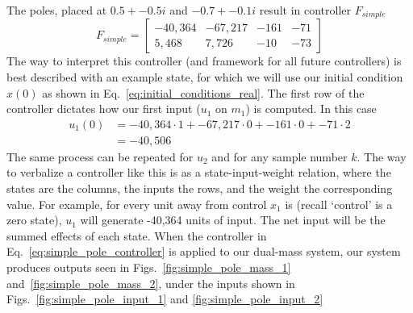 The poles, placed at $0.5 +- 0.5i$ and $-0.7 +- 0.1i$ result in controller $F_{simple}$
\begin{equation}
    F_{simple} = 
    \begin{bmatrix}
        -40,364&-67,217&-161&-71\\5,468&7,726&-10&-73
    \end{bmatrix}
    \label{eq:simple_pole_controller}
\end{equation}
The way to interpret this controller (and framework for all future controllers) is best described with an example state, for which we will use our initial condition $x\left(0\right)$ as shown in Eq.~\ref{eq:initial_conditions_real}. The first row of the controller dictates how our first input ($u_1$ on $m_1$) is computed. In this case
\begin{equation}
    \begin{split}
        u_1\left(0\right)&=-40,364\cdot1+-67,217\cdot0+-161\cdot0+-71\cdot2\\
        &=-40,506
    \end{split}
    \label{eq:example_control_use_u0}
\end{equation}
The same process can be repeated for $u_2$ and for any sample number $k$. The way to verbalize a controller like this is as a state-input-weight relation, where the states are the columns, the inputs the rows, and the weight the corresponding value. For example, for every unit away from control $x_1$ is (recall `control' is a zero state), $u_1$ will generate -40,364 units of input. The net input will be the summed effects of each state.
When the controller in Eq.~\ref{eq:simple_pole_controller} is applied to our dual-mass system, our system produces outputs seen in Figs.~\ref{fig:simple_pole_mass_1} and~\ref{fig:simple_pole_mass_2}, under the inputs shown in Figs.~\ref{fig:simple_pole_input_1} and {\ref{fig:simple_pole_input_2}}

